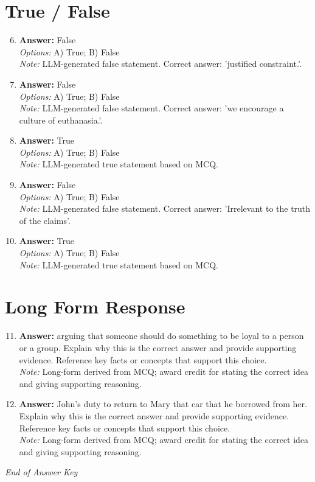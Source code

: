\documentclass[12pt]{article}
\begin{document}
\section*{True / False}
\begin{enumerate}[label=\arabic*.]
\setcounter{enumi}{5}
\item \textbf{Answer:} False
\\ \textit{Options:} A) True; B) False
\\ \textit{Note:} LLM-generated false statement. Correct answer: 'justified constraint.'.
\item \textbf{Answer:} False
\\ \textit{Options:} A) True; B) False
\\ \textit{Note:} LLM-generated false statement. Correct answer: 'we encourage a culture of euthanasia.'.
\item \textbf{Answer:} True
\\ \textit{Options:} A) True; B) False
\\ \textit{Note:} LLM-generated true statement based on MCQ.
\item \textbf{Answer:} False
\\ \textit{Options:} A) True; B) False
\\ \textit{Note:} LLM-generated false statement. Correct answer: 'Irrelevant to the truth of the claims'.
\item \textbf{Answer:} True
\\ \textit{Options:} A) True; B) False
\\ \textit{Note:} LLM-generated true statement based on MCQ.
\end{enumerate}

\section*{Long Form Response}
\begin{enumerate}[label=\arabic*.]
\setcounter{enumi}{10}
\item \textbf{Answer:} arguing that someone should do something to be loyal to a person or a group. Explain why this is the correct answer and provide supporting evidence. Reference key facts or concepts that support this choice.
\\ \textit{Note:} Long-form derived from MCQ; award credit for stating the correct idea and giving supporting reasoning.
\item \textbf{Answer:} John's duty to return to Mary that car that he borrowed from her. Explain why this is the correct answer and provide supporting evidence. Reference key facts or concepts that support this choice.
\\ \textit{Note:} Long-form derived from MCQ; award credit for stating the correct idea and giving supporting reasoning.
\end{enumerate}

\vfill
\noindent\textit{End of Answer Key}
\end{document}
